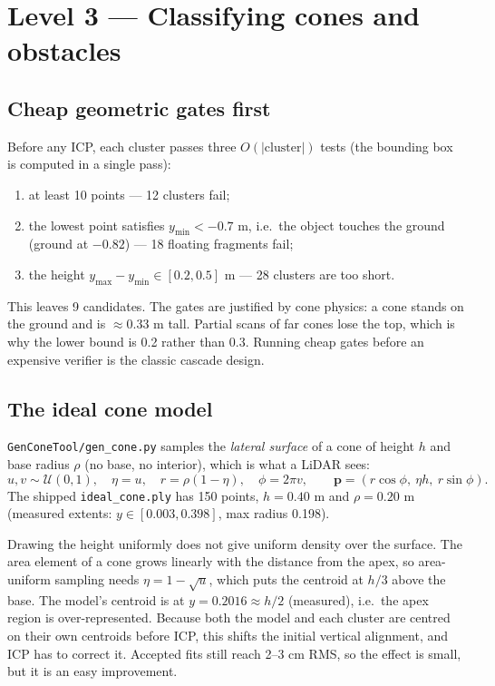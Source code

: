 \documentclass[10pt,a4paper]{scrartcl}
\renewcommand{\emph}[1]{\textcolor{accent}{#1}}
\newcommand{\code}[1]{\texttt{#1}}
\newcommand{\file}[1]{\texttt{\small #1}}
\newcommand{\RuleSection}[1]{%
    \section{#1}%
    \vspace{0.2em}{\color{accent!35}\hrule height 0.4pt}\vspace{0.3em}%
  }
\begin{document}
  \RuleSection{Level 3 --- Classifying cones and obstacles}
  \label{sec:l3}

  \subsection{Cheap geometric gates first}

  Before any ICP, each cluster passes three $O(|\text{cluster}|)$ tests (the bounding
  box is computed in a single pass):
  \begin{enumerate}
    \item at least 10 points --- 12 clusters fail;
    \item the lowest point satisfies $y_{\min}<-0.7$ m, i.e.\ the object touches the
      ground (ground at $-0.82$) --- 18 floating fragments fail;
    \item the height $y_{\max}-y_{\min}\in[0.2,0.5]$ m --- 28 clusters are too short.
  \end{enumerate}
  This leaves \emph{9 candidates}. The gates are justified by cone physics: a cone
  stands on the ground and is $\approx$0.33 m tall. Partial scans of far cones lose
  the top, which is why the lower bound is 0.2 rather than 0.3. Running cheap gates
  before an expensive verifier is the classic cascade design.

  \subsection{The ideal cone model}

  \file{GenConeTool/gen\_cone.py} samples the \textit{lateral surface} of a cone of
  height $h$ and base radius $\rho$ (no base, no interior), which is what a LiDAR
  sees:
  \begin{equation}
    u,v\sim\mathcal U(0,1),\quad \eta=u,\quad r=\rho(1-\eta),\quad \phi=2\pi v,\qquad
    \bm p=(r\cos\phi,\ \eta h,\ r\sin\phi).
  \end{equation}
  The shipped \code{ideal\_cone.ply} has 150 points, $h=0.40$ m and $\rho=0.20$ m
  (measured extents: $y\in[0.003,0.398]$, max radius 0.198).

  \begin{warnbox}
  \small
  Drawing the height uniformly does \emph{not} give uniform density over the surface. The
  area element of a cone grows linearly with the distance from the apex, so area-uniform
  sampling needs $\eta=1-\sqrt{u}$, which puts the centroid at $h/3$ above the base. The
  model's centroid is at $y=0.2016\approx h/2$ (measured), i.e.\ the apex region is
  over-represented. Because both the model and each cluster are centred on their own
  centroids before ICP, this shifts the initial vertical alignment, and ICP has to
  correct it. Accepted fits still reach 2--3 cm RMS, so the effect is small, but it
  is an easy improvement.
  \end{warnbox}
\end{document}
